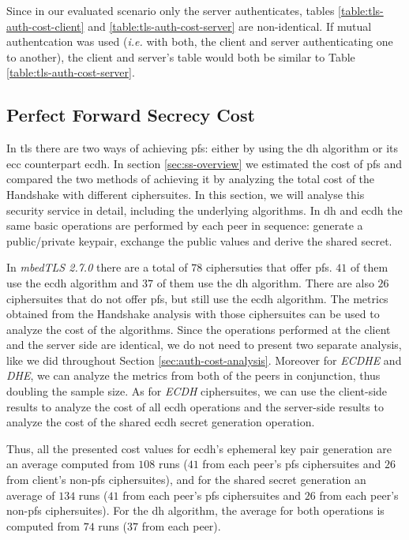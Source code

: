 \documentclass{llncs}
\begin{document}
Since in our evaluated scenario only the server authenticates, tables \ref{table:tls-auth-cost-client} and \ref{table:tls-auth-cost-server}
are non-identical. If mutual authentcation was used (\textit{i.e.} with both, the client and server authenticating one to another), the client
and server's table would both be similar to Table \ref{table:tls-auth-cost-server}.

\subsection{Perfect Forward Secrecy Cost}

In \gls{tls} there are two ways of achieving \gls{pfs}: either by using the \gls{dh} algorithm or its \gls{ecc} counterpart \gls{ecdh}.
In section \ref{sec:ss-overview} we estimated the cost of \gls{pfs} and compared the two methods of achieving it by analyzing the total cost of the
Handshake with different ciphersuites. In this section, we will analyse this security service in detail, including the underlying algorithms.
In \gls{dh} and \gls{ecdh} the same basic operations are performed by each peer in sequence: generate a public/private keypair, exchange the public values
and derive the shared secret.

In \textit{mbedTLS 2.7.0} there are a total of $78$ ciphersuties that offer \gls{pfs}. $41$ of them use the \gls{ecdh} algorithm and $37$ of them use
the \gls{dh} algorithm. There are also $26$ ciphersuites that do not offer \gls{pfs}, but still use the \gls{ecdh} algorithm. The metrics obtained from the 
Handshake analysis with those ciphersuites can be used to analyze the cost of the algorithms. Since the operations performed at the client and 
the server side are identical, we do not need to present two separate analysis, like we did throughout Section \ref{sec:auth-cost-analysis}. 
Moreover for \textit{ECDHE} and \textit{DHE}, we can analyze the metrics from both  of the peers in conjunction, thus doubling the sample size. 
As for \textit{ECDH} ciphersuites, we can use the client-side results to analyze the cost of all \gls{ecdh} operations and the server-side results 
to analyze the cost of the shared \gls{ecdh} secret generation operation.

Thus, all the presented cost values for \gls{ecdh}'s ephemeral key pair generation are an average computed from $108$ runs ($41$ from each
peer's \gls{pfs} ciphersuites and $26$ from client's non-\gls{pfs} ciphersuites),
and for the shared secret generation an average of $134$ runs ($41$ from each peer's \gls{pfs} ciphersuites and $26$ from each peer's non-\gls{pfs} 
ciphersuites). For the \gls{dh} algorithm, the average for both operations is computed from $74$ runs ($37$ from each peer). 
\end{document}
